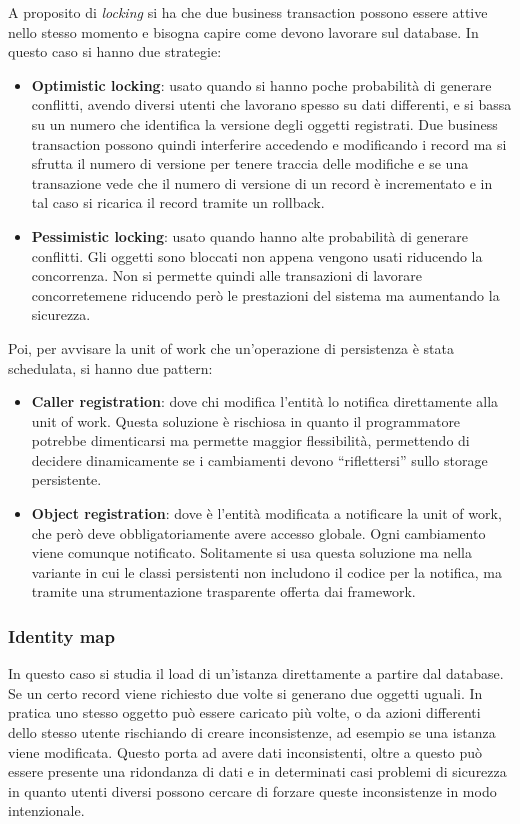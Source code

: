 A proposito di \textit{locking} si ha che due business transaction possono essere
attive nello stesso momento e bisogna capire come devono lavorare sul database.
In questo caso si hanno due strategie:
\begin{itemize}
      \item \textbf{Optimistic locking}: usato quando si hanno poche probabilità
            di generare conflitti, avendo diversi utenti che lavorano spesso su
            dati differenti, e si bassa su un numero che identifica la versione
            degli oggetti registrati. Due business transaction possono quindi
            interferire accedendo e modificando i record ma si sfrutta il numero
            di versione per tenere traccia delle modifiche e se una transazione
            vede che il numero di versione di un record è incrementato e in tal
            caso si ricarica il record tramite un rollback.
      \item \textbf{Pessimistic locking}: usato quando hanno alte probabilità di
            generare conflitti. Gli oggetti sono bloccati non appena vengono
            usati riducendo la concorrenza. Non si permette quindi alle
            transazioni di lavorare concorretemene riducendo però le prestazioni
            del sistema ma aumentando la sicurezza.
\end{itemize}
Poi, per avvisare la unit of work che un'operazione di persistenza è stata
schedulata, si hanno due pattern:
\begin{itemize}
      \item \textbf{Caller registration}: dove chi modifica l'entità lo notifica
            direttamente alla unit of work. Questa soluzione è rischiosa in quanto
            il programmatore potrebbe dimenticarsi ma permette maggior
            flessibilità, permettendo di decidere dinamicamente se i cambiamenti
            devono “riflettersi” sullo storage persistente.
      \item \textbf{Object registration}: dove è l'entità modificata a notificare
            la unit of work, che però deve obbligatoriamente avere accesso globale.
            Ogni cambiamento viene comunque notificato. Solitamente si usa questa
            soluzione ma nella variante in cui le classi persistenti non includono
            il codice per la notifica, ma tramite una strumentazione trasparente
            offerta dai framework.
\end{itemize}
\subsubsection{Identity map}
In questo caso si studia il load di un'istanza direttamente a partire dal database.
Se un certo record viene richiesto due volte si generano due oggetti uguali.
In pratica uno stesso oggetto può essere caricato più volte, o da azioni differenti
dello stesso utente rischiando di creare inconsistenze, ad esempio se una istanza
viene modificata. Questo porta ad avere dati inconsistenti, oltre a questo può
essere presente una ridondanza di dati e in determinati casi problemi di
sicurezza in quanto utenti diversi possono cercare di forzare queste
inconsistenze in modo intenzionale.


